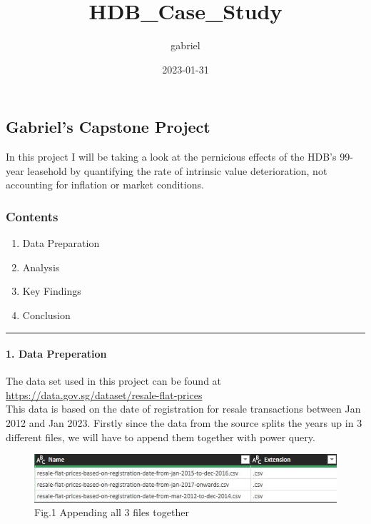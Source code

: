 \documentclass[
]{article}
\title{HDB\_Case\_Study}
\author{gabriel}
\date{2023-01-31}
\providecommand{\tightlist}{%
  \setlength{\itemsep}{0pt}\setlength{\parskip}{0pt}}
\begin{document}
\maketitle

\hypertarget{gabriels-capstone-project}{%
\subsection{Gabriel's Capstone
Project}\label{gabriels-capstone-project}}

In this project I will be taking a look at the pernicious effects of the
HDB's 99-year leasehold by quantifying the rate of intrinsic value
deterioration, not accounting for inflation or market conditions.

\hypertarget{contents}{%
\subsubsection{Contents}\label{contents}}

\begin{enumerate}
\def\labelenumi{\arabic{enumi}.}
\tightlist
\item
  Data Preparation
\item
  Analysis\\
\item
  Key Findings
\item
  Conclusion
\end{enumerate}

\begin{center}\rule{0.5\linewidth}{0.5pt}\end{center}

\hypertarget{data-preperation}{%
\paragraph{1. Data Preperation}\label{data-preperation}}

The data set used in this project can be found at
\url{https://data.gov.sg/dataset/resale-flat-prices}\\
This data is based on the date of registration for resale transactions
between Jan 2012 and Jan 2023. Firstly since the data from the source
splits the years up in 3 different files, we will have to append them
together with power query.

\begin{figure}
\centering
\includegraphics{images/process_append.jpeg}
\caption{Fig.1 Appending all 3 files together}
\end{figure}
\end{document}
